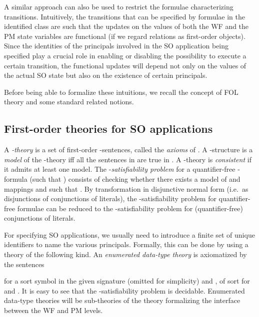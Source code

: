 \documentclass[conference]{IEEEtran}
\begin{document}
A similar approach can also be used to restrict the formulae
characterizing transitions.  Intuitively, the transitions that can be
specified by formulae in the identified class are such that the
updates on the values of both the WF and the PM state variables are
functional (if we regard relations as first-order objects).  Since the
identities of the principals involved in the SO application being
specified play a crucial role in enabling or disabling the possibility
to execute a certain transition, the functional updates will depend
not only on the values of the actual SO state but also on the
existence of certain principals.

Before being able to formalize these intuitions, we recall the concept
of FOL theory and some standard related notions.

\subsection{First-order theories for SO applications}
\label{subsec:fol-theories-for-SOAs}
A \emph{-theory}  is a set of first-order
-sentences, called the \emph{axioms} of .  A
-structure  is a \emph{model} of the
-theory  iff all the sentences in  are true in
.  A -theory  is \emph{consistent} if it
admits at least one model.
The -\emph{satisfiability problem} for a quantifier-free
-formula  (such that
) consists of checking whether
there exists a model  of  and mappings  and 
such that .  By transformation in
disjunctive normal form (i.e.~as disjunctions of conjunctions of
literals), the -satisfiability problem for quantifier-free formulae
can be reduced to the -satisfiability problem for (quantifier-free)
conjunctions of literals.

For specifying SO applications, we usually need to introduce a finite
set of unique identifiers to name the various principals.  Formally,
this can be done by using a theory of the following kind.  An
\emph{enumerated data-type theory } is axiomatized
by the sentences

for  a sort symbol in the given signature (omitted for simplicity)
and ,  of sort  for  and .  It is easy to see that the
-satisfiability problem is decidable.  Enumerated
data-type theories will be sub-theories of the theory formalizing the
interface between the WF and PM levels.
\end{document}
